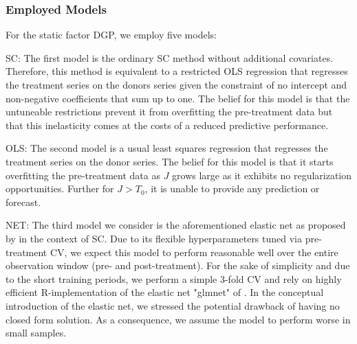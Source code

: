 \subsubsection{Employed Models}
For the static factor \ac{DGP}, we employ five models: 

SC: The first model is the ordinary \ac{SC} method without additional covariates. Therefore, this method is equivalent to a restricted \ac{OLS} regression that regresses the treatment series on the donors series given the constraint of no intercept and non-negative coefficients that sum up to one. The belief for this model is that the untuneable restrictions prevent it from overfitting the pre-treatment data but that this inelasticity comes at the costs of a reduced predictive performance.

OLS: The second model is a usual least squares regression that regresses the treatment series on the donor series. The belief for this model is that it starts overfitting the pre-treatment data as $J$ grows large as it exhibits no regularization opportunities. Further for $J > T_0$, it is unable to provide any prediction or forecast.

NET: The third model we consider is the aforementioned elastic net as proposed by \cite{doudchenko:2016} in the context of \ac{SC}. Due to its flexible hyperparameters tuned via pre-treatment \ac{CV}, we expect this model to perform reasonable well over the entire observation window (pre- and post-treatment). For the sake of simplicity and due to the short training periods, we perform a simple 3-fold \ac{CV} and rely on highly efficient R-implementation of the elastic net "glmnet" of \cite{friedman:2010}. In the conceptual introduction of the elastic net, we stressed the potential drawback of having no closed form solution. As a consequence, we assume the model to perform worse in small samples.

